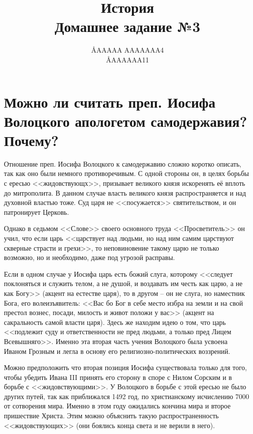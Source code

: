 \documentclass[12pt]{article}
\title{История \\ Домашнее задание №3}
\author{\AA{AAAAA AAAAAAA}{4} \\ \AA{AAAAAA}{11}}
\begin{document}
  \maketitle
  \setcounter{section}{2}

  \section{Можно ли считать преп. Иосифа Волоцкого апологетом\protect\footnotemark{} самодержавия\protect\footnotemark{}? Почему?}
  \addtocounter{footnote}{-2}

  Отношение преп. Иосифа Волоцкого к самодержавию сложно коротко описать, так как оно были немного противоречивым.
  С одной стороны он, в целях борьбы с ересью <<жидовствующх>>, призывает великого князя искоренять её вплоть до митрополита.
  В данном случае власть великого князя распространяется и над духовной властью тоже.
  Суд царя не <<посужается>> святительством, и он патронирует Церковь.

  Однако в седьмом <<Слове>> своего основного труда <<Просветитель>> он учил,
  что если царь <<царствует над людьми, но над ним самим царствуют скверные страсти и грехи>>,
  то неповиновение такому царю не только возможно, но и необходимо, даже под угрозой расправы.

  Если в одном случае у Иосифа царь есть божий слуга,
  которому <<следует поклоняться и служить телом, а не душой, и воздавать им честь как царю, а не как Богу>> (акцент на естестве царя),
  то в другом -- он не слуга, но наместник Бога, его волеизъявитель:
  <<Вас бо Бог в себе место избра на земли и на свой престол вознес, посади, милость и живот положи у вас>>
  (акцент на сакральность самой власти царя).
  Здесь же находим идею о том, что царь <<подлежит суду и ответственности не пред людьми, а только пред Лицем Всевышняго>>.
  Именно эта вторая часть учения Волоцкого была усвоена Иваном Грозным и легла в основу его религиозно-политических воззрений.

  Можно предположить что вторая позиция Иосифа существовала только для того,
  чтобы убедить Ивана III принять его сторону в споре с Нилом Сорским и в борьбе с <<жидовствующими>>.
  У Волоцкого в борьбе с этой ересью не было других путей, так как приближался 1492 год, по христианскому исчислению 7000 от сотворения мира.
  Именно в этом году ожидались кончина мира и второе пришествие Христа.
  Этим можно объяснить такую распространенность <<жидовствующих>> (они боялись конца света и не верили в него).
\end{document}
